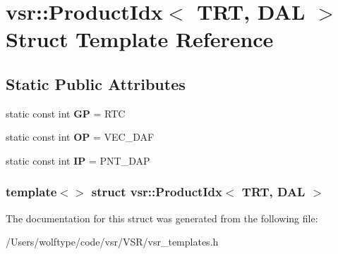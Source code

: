 \hypertarget{structvsr_1_1_product_idx_3_01_t_r_t_00_01_d_a_l_01_4}{\section{vsr\-:\-:Product\-Idx$<$ T\-R\-T, D\-A\-L $>$ Struct Template Reference}
\label{structvsr_1_1_product_idx_3_01_t_r_t_00_01_d_a_l_01_4}
}
\subsection*{Static Public Attributes}
\begin{DoxyCompactItemize}
\item 
\hypertarget{structvsr_1_1_product_idx_3_01_t_r_t_00_01_d_a_l_01_4_a2b241f02d8633149f3ed069921269870}{static const int {\bfseries G\-P} = R\-T\-C}\label{structvsr_1_1_product_idx_3_01_t_r_t_00_01_d_a_l_01_4_a2b241f02d8633149f3ed069921269870}

\item 
\hypertarget{structvsr_1_1_product_idx_3_01_t_r_t_00_01_d_a_l_01_4_a96cbb56a3d4add6ec4ac340eaedd0083}{static const int {\bfseries O\-P} = V\-E\-C\-\_\-\-D\-A\-F}\label{structvsr_1_1_product_idx_3_01_t_r_t_00_01_d_a_l_01_4_a96cbb56a3d4add6ec4ac340eaedd0083}

\item 
\hypertarget{structvsr_1_1_product_idx_3_01_t_r_t_00_01_d_a_l_01_4_a147cd68b209c0bbf6f42577d2a85c72e}{static const int {\bfseries I\-P} = P\-N\-T\-\_\-\-D\-A\-P}\label{structvsr_1_1_product_idx_3_01_t_r_t_00_01_d_a_l_01_4_a147cd68b209c0bbf6f42577d2a85c72e}

\end{DoxyCompactItemize}
\subsubsection*{template$<$$>$ struct vsr\-::\-Product\-Idx$<$ T\-R\-T, D\-A\-L $>$}



The documentation for this struct was generated from the following file\-:\begin{DoxyCompactItemize}
\item 
/\-Users/wolftype/code/vsr/\-V\-S\-R/vsr\-\_\-templates.\-h\end{DoxyCompactItemize}
